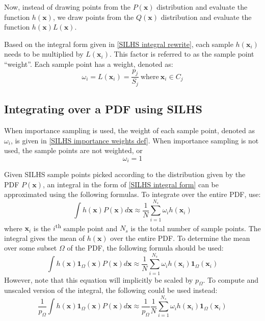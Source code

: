 \documentclass[11pt,fleqn]{article}
\begin{document}
Now, instead of drawing points from the $P(\mathbf{x})$ distribution and
evaluate the function $h(\mathbf{x})$, we draw points from the $Q(\mathbf{x})$
distribution and evaluate the function $h(\mathbf{x}) L(\mathbf{x})$.

Based on the integral form given in \eqref{SILHS integral rewrite}, each sample
$h(\mathbf{x}_i)$ needs to be multiplied by $L(\mathbf{x}_i)$. This factor is
referred to as the sample point ``weight''. Each sample point has a weight,
denoted as:
\begin{equation}
\omega_i = L(\mathbf{x}_i) = \frac{p_j}{S_j}\ \mathrm{where}\ \mathbf{x}_i\in
C_j \label{SILHS importance weights def}
\end{equation}

\subsection{Integrating over a PDF using SILHS}

When importance sampling is used, the weight of each sample point, denoted as
$\omega_i$, is given in \eqref{SILHS importance weights def}. When importance
sampling is not used, the sample points are not weighted, or
\begin{equation}
\omega_i = 1
\end{equation}

Given SILHS sample points picked according to the distribution given by the PDF
$P(\mathbf{x})$, an integral in the form of \eqref{SILHS integral form} can be
approximated using the following formulas. To integrate over the entire PDF,
use:
\begin{equation}
\int h(\mathbf{x}) P(\mathbf{x}) d\mathbf{x} \approx \frac{1}{N}
\sum_{i=1}^{N_s} \omega_i h(\mathbf{x}_i)
\end{equation}
where $\mathbf{x}_i$ is the $i$\textsuperscript{th} sample point and $N_s$ is
the total number of sample points. The integral gives the mean of
$h(\mathbf{x})$ over the entire PDF. To determine the mean over some subset
$\Omega$ of the PDF, the following formula should be used:
\begin{equation}
\int h(\mathbf{x})\mathbf{1}_\Omega(\mathbf{x}) P(\mathbf{x}) d\mathbf{x}
\approx \frac{1}{N}\sum_{i=1}^{N_s} \omega_i
h(\mathbf{x}_i) \mathbf{1}_\Omega(\mathbf{x}_i)
\end{equation}
However, note that this equation will implicitly be scaled by $p_\Omega$. To
compute and unscaled version of the integral, the following could be used
instead:
\begin{equation}
\frac{1}{p_\Omega}
\int h(\mathbf{x})\mathbf{1}_\Omega(\mathbf{x}) P(\mathbf{x}) d\mathbf{x}
\approx \frac{1}{p_\Omega}\frac{1}{N}\sum_{i=1}^{N_s} \omega_i
h(\mathbf{x}_i) \mathbf{1}_\Omega(\mathbf{x}_i)
\end{equation}
\end{document}

